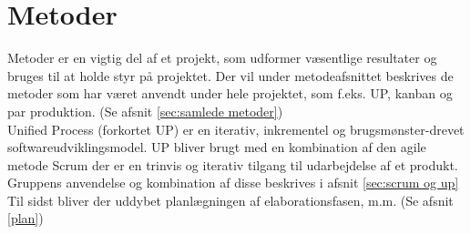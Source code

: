 \chapter{Metoder} \label{cap:metoder}
Metoder er en vigtig del af et projekt, som udformer væsentlige resultater og bruges til at holde styr på projektet. Der vil under metodeafsnittet beskrives de metoder som har været anvendt under hele projektet, som f.eks. UP, kanban og par produktion. (Se afsnit \ref{sec:samlede metoder}) \\
Unified Process (forkortet UP) er en iterativ, inkrementel og brugsmønster-drevet softwareudviklingsmodel. UP bliver brugt med en kombination af den agile metode Scrum der er en trinvis og iterativ tilgang til udarbejdelse af et produkt. Gruppens anvendelse og kombination af disse beskrives i afsnit \ref{sec:scrum og up} \\
Til sidst bliver der uddybet planlægningen af elaborationsfasen, m.m. (Se afsnit \ref{plan})
\newpage
